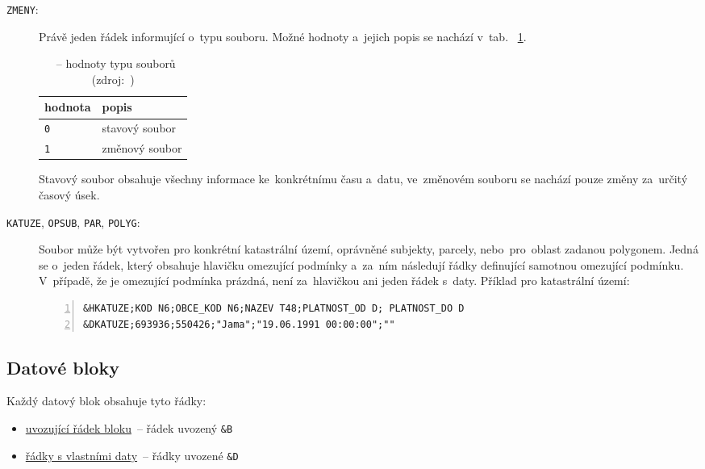 \begin{description}
	\item[\texttt{ZMENY}:] Právě jeden řádek informující o~typu
souboru. Možné hodnoty a~jejich popis se nachází v~tab.~
\ref{tab:zmeny}.

    \begin{table}[H]
        \begin{tabular}{|l|l|} \hline hodnota & popis \\ \hline \hline
\texttt{0} & stavový soubor \\ \hline \texttt{1} & změnový soubor \\
\hline
        \end{tabular} \centering
        \caption[~– hodnoty typu souborů]{~– hodnoty
typu souborů (zdroj:~\citep{struktura_vfk})}
        \label{tab:zmeny}
    \end{table}

Stavový soubor obsahuje všechny informace ke~konkrétnímu času a~datu,
ve~změno\-vém souboru se nachází pouze změny za~určitý časový úsek.

	\item[\texttt{KATUZE}, \texttt{OPSUB}, \texttt{PAR},
\texttt{POLYG}:] Soubor  může být vytvořen pro konkrétní
kata\-strální území, oprávněné subjekty, parcely, nebo~pro~oblast
zadanou polygonem. Jedná se o~jeden řádek, který obsahuje hlavičku
omezující podmínky a~za~ním následují řádky definující samotnou
omezující podmínku. V~případě, že je omezující podmínka prázdná, není
za~hlavičkou ani jeden řádek s~daty. Příklad pro katastrální území:

\begin{lstlisting}[basicstyle=\footnotesize\ttfamily, backgroundcolor
    = \color{light-gray}, numbers=left]
&HKATUZE;KOD N6;OBCE_KOD N6;NAZEV T48;PLATNOST_OD D; PLATNOST_DO D
&DKATUZE;693936;550426;"Jama";"19.06.1991 00:00:00";""
 \end{lstlisting}

\end{description}

\subsection{Datové bloky}
\label{datove_bloky}

Každý datový blok obsahuje tyto řádky:
	\begin{itemize}[leftmargin=1.5cm, noitemsep]
		\item \underline{uvozující řádek bloku}~– řádek
uvozený \texttt{\&B}
		\item \underline{řádky s vlastními daty}~– řádky
uvozené \texttt{\&D}
	\end{itemize}

